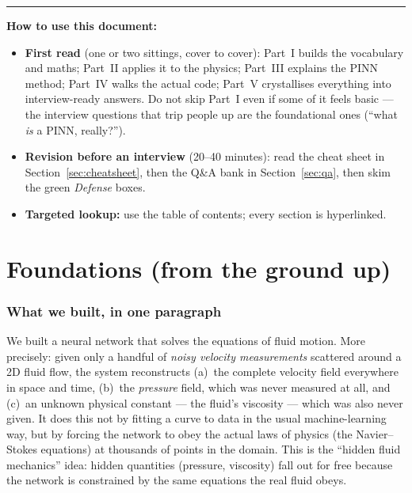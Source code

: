 \documentclass[11pt,a4paper]{article}
\begin{document}
\vspace{1em}
\hrule
\vspace{1em}

\noindent\textbf{How to use this document:}
\begin{itemize}[leftmargin=2em]
  \item \textbf{First read} (one or two sittings, cover to cover): Part~I
        builds the vocabulary and maths; Part~II applies it to the physics;
        Part~III explains the PINN method; Part~IV walks the actual code;
        Part~V crystallises everything into interview-ready answers. Do not
        skip Part~I even if some of it feels basic --- the interview questions
        that trip people up are the foundational ones (``what \emph{is} a
        PINN, really?'').
  \item \textbf{Revision before an interview} (20--40 minutes): read the cheat
        sheet in Section~\ref{sec:cheatsheet}, then the Q\&A bank in
        Section~\ref{sec:qa}, then skim the green \textit{Defense} boxes.
  \item \textbf{Targeted lookup:} use the table of contents; every section is
        hyperlinked.
\end{itemize}

\newpage
\tableofcontents
\newpage

\part{Foundations (from the ground up)}
\label{part:foundations}

\section{What we built, in one paragraph}
\label{sec:what-we-built}

We built a neural network that solves the equations of fluid motion. More
precisely: given only a handful of \emph{noisy velocity measurements} scattered
around a 2D fluid flow, the system reconstructs (a)~the complete velocity field
everywhere in space and time, (b)~the \emph{pressure} field, which was never
measured at all, and (c)~an unknown physical constant --- the fluid's viscosity
--- which was also never given. It does this not by fitting a curve to data in
the usual machine-learning way, but by forcing the network to obey the actual
laws of physics (the Navier--Stokes equations) at thousands of points in the
domain. This is the ``hidden fluid mechanics'' idea: hidden quantities
(pressure, viscosity) fall out for free because the network is constrained by
the same equations the real fluid obeys.
\end{document}
